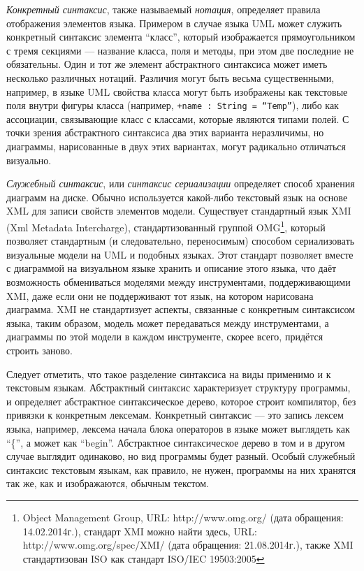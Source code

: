 \textit{Конкретный синтаксис}, также называемый \textit{нотация}, определяет правила отображения 
элементов языка. Примером в случае языка \ac{UML} может служить конкретный синтаксис 
элемента "`класс"', который изображается прямоугольником с тремя секциями --- 
название класса, поля и методы, при этом две последние не обязательны. Один и 
тот же элемент абстрактного синтаксиса может иметь несколько различных нотаций. 
Различия могут быть весьма существенными, например, в языке \ac{UML} свойства класса 
могут быть изображены как текстовые поля внутри фигуры класса (например, 
\verb|+name : String = “Temp”|), либо как ассоциации, связывающие класс с 
классами, которые являются типами полей. С точки зрения абстрактного синтаксиса 
два этих варианта неразличимы, но диаграммы, нарисованные в двух этих вариантах, 
могут радикально отличаться визуально.

\textit{Служебный синтаксис}, или \textit{синтаксис сериализации} определяет способ хранения 
диаграмм на диске. Обычно используется какой-либо текстовый язык на основе \ac{XML} 
для записи свойств элементов модели. Существует стандартный язык XMI 
(Xml Metadata Intercharge), стандартизованный группой 
OMG\footnote{Object Management Group, URL: http://www.omg.org/ (дата обращения: 14.02.2014г.), 
стандарт XMI можно найти здесь, URL: http://www.omg.org/spec/XMI/ (дата обращения: 21.08.2014г.), 
также XMI стандартизован ISO как стандарт ISO/IEC 19503:2005}, 
который позволяет стандартным (и следовательно, переносимым) способом сериализовать визуальные 
модели на \ac{UML} и подобных языках. Этот стандарт позволяет вместе с диаграммой 
на визуальном языке хранить и описание этого языка, что даёт возможность 
обмениваться моделями между инструментами, поддерживающими XMI, даже если они 
не поддерживают тот язык, на котором нарисована диаграмма. 
XMI не стандартизует аспекты, связанные с конкретным синтаксисом языка, таким образом, модель может 
передаваться между инструментами, а диаграммы по этой модели в каждом 
инструменте, скорее всего, придётся строить заново.

Следует отметить, что такое разделение синтаксиса на виды применимо и к 
текстовым языкам. Абстрактный синтаксис характеризует структуру программы, и 
определяет абстрактное синтаксическое дерево, которое строит компилятор, 
без привязки к конкретным лексемам. Конкретный синтаксис --- это запись лексем 
языка, например, лексема начала блока операторов в языке может выглядеть как 
"`\{"', а может как "`begin"'. Абстрактное синтаксическое дерево в том и в 
другом случае выглядит одинаково, но вид программы будет разный. Особый 
служебный синтаксис текстовым языкам, как правило, не нужен, программы на них 
хранятся так же, как и изображаются, обычным текстом.

